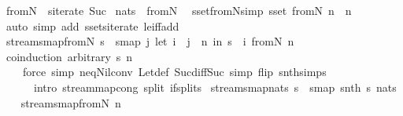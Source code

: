 \begin{isabellebody}
\ {\isachardoublequoteopen}fromN\ {\isasymequiv}\ siterate\ Suc{\isachardoublequoteclose}\isanewline
\isanewline
{}\isamarkupfalse%
\ {\isachardoublequoteopen}nats\ {\isasymequiv}\ fromN\ {}{\isachardoublequoteclose}\isanewline
\isanewline
{}\isamarkupfalse%
\ sset{\isacharunderscore}fromN{\isacharbrackleft}simp{\isacharbrackright}{\isacharcolon}\ {\isachardoublequoteopen}sset\ {\isacharparenleft}fromN\ n{\isacharparenright}\ {\isacharequal}\ {\isacharbraceleft}n\ {\isachardot}{\isachardot}{\isacharbraceright}{\isachardoublequoteclose}\isanewline
%
\isadelimproof
\ \ %
\endisadelimproof
%
\isatagproof
{}\isamarkupfalse%
\ {\isacharparenleft}auto\ simp\ add{\isacharcolon}\ sset{\isacharunderscore}siterate\ le{\isacharunderscore}iff{\isacharunderscore}add{\isacharparenright}%
\endisatagproof
{\isafoldproof}%
%
\isadelimproof
\isanewline
%
\endisadelimproof
\isanewline
{}\isamarkupfalse%
\ stream{\isacharunderscore}smap{\isacharunderscore}fromN{\isacharcolon}\ {\isachardoublequoteopen}s\ {\isacharequal}\ smap\ {\isacharparenleft}{\isasymlambda}j{\isachardot}\ let\ i\ {\isacharequal}\ j\ {\isacharminus}\ n\ in\ s\ {\isacharbang}{\isacharbang}\ i{\isacharparenright}\ {\isacharparenleft}fromN\ n{\isacharparenright}{\isachardoublequoteclose}\isanewline
%
\isadelimproof
\ \ %
\endisadelimproof
%
\isatagproof
{}\isamarkupfalse%
\ {\isacharparenleft}coinduction\ arbitrary{\isacharcolon}\ s\ n{\isacharparenright}\isanewline
\ \ \ \ {\isacharparenleft}force\ simp{\isacharcolon}\ neq{\isacharunderscore}Nil{\isacharunderscore}conv\ Let{\isacharunderscore}def\ Suc{\isacharunderscore}diff{\isacharunderscore}Suc\ simp\ flip{\isacharcolon}\ snth{\isachardot}simps{\isacharparenleft}{}{\isacharparenright}\isanewline
\ \ \ \ \ \ intro{\isacharcolon}\ stream{\isachardot}map{\isacharunderscore}cong\ split{\isacharcolon}\ if{\isacharunderscore}splits{\isacharparenright}%
\endisatagproof
{\isafoldproof}%
%
\isadelimproof
\isanewline
%
\endisadelimproof
\isanewline
{}\isamarkupfalse%
\ stream{\isacharunderscore}smap{\isacharunderscore}nats{\isacharcolon}\ {\isachardoublequoteopen}s\ {\isacharequal}\ smap\ {\isacharparenleft}snth\ s{\isacharparenright}\ nats{\isachardoublequoteclose}\isanewline
%
\isadelimproof
\ \ %
\endisadelimproof
%
\isatagproof
{}\isamarkupfalse%
\ stream{\isacharunderscore}smap{\isacharunderscore}fromN{\isacharbrackleft}\ n\ {\isacharequal}\ {}{\isacharbrackright}\ \isamarkupfalse%

\end{isabellebody}

